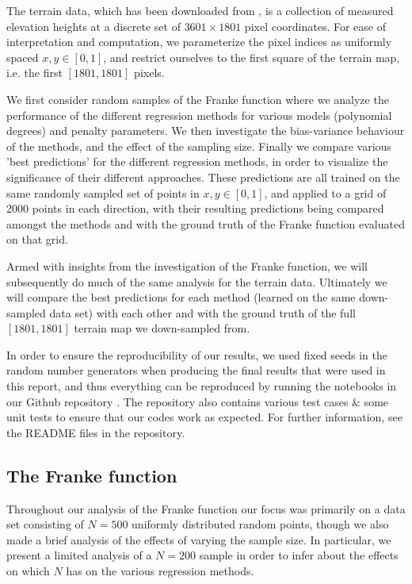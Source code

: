 \documentclass[reprint, english, nofootinbib]{revtex4-2}
\begin{document}
The terrain data, which has been downloaded from \cite{4155_repo}, is a collection of measured elevation heights at a discrete set of $3601\times1801$ pixel coordinates. For ease of interpretation and computation, we parameterize the pixel indices as uniformly spaced $x,y \in [0,1]$, and restrict ourselves to the first square of the terrain map, i.e. the first $[1801,1801]$ pixels.

We first consider random samples of the Franke function where we analyze the performance of the different regression methods for various models (polynomial degrees) and penalty parameters. We then investigate the bias-variance behaviour of the methods, and the effect of the sampling size.  Finally we compare various 'best predictions' for the different regression methods, in order to visualize the significance of their different approaches. These predictions are all trained on the same randomly sampled set of points in $x,y \in [0,1]$, and applied to a grid of 2000 points in each direction, with their resulting predictions being compared amongst the methods and with the ground truth of the Franke function evaluated on that grid.

Armed with insights from the investigation of the Franke function, we will subsequently do much of the same analysis for the terrain data. Ultimately we will compare the best predictions for each method (learned on the same down-sampled data set) with each other and with the ground truth of the full $[1801,1801]$ terrain map we down-sampled from.

In order to ensure the reproducibility of our results, we used fixed seeds in the random number generators when producing the final results that were used in this report, and thus everything can be reproduced by running the notebooks in our Github repository \cite{our_repo}. The repository also contains various test cases \& some unit tests to ensure that our codes work as expected. For further information, see the README files in the repository.

\subsection{The Franke function}

\noindent
Throughout our analysis of the Franke function our focus was primarily on a data set consisting of $N=500$ uniformly distributed random points, though we also made a brief analysis of the effects of varying the sample size. In particular, we present a limited analysis of a $N=200$ sample in order to infer about the effects on which $N$ has on the various regression methods.
\end{document}
